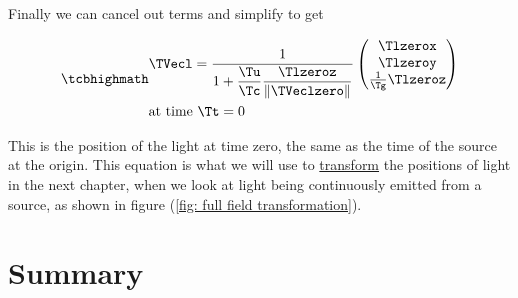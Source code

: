 

Finally we can cancel out terms and simplify to get

\begin{equation}
	\label{eq: time synced transform}
	\mhl{
		\begin{aligned}
			 & \TVecl  =
			\dfrac{1}{1 + \dfrac{\Tu }{\Tc } \dfrac{\Tlzeroz  }{\|\TVeclzero \|} }
			\begin{pmatrix}
				\Tlzerox                     \\
				\Tlzeroy                     \\
				\frac{1}{ \Tg  } \Tlzeroz  \\
			\end{pmatrix}
			\\
			 & \text{at time ${\Tt }=0$}
		\end{aligned}
	}
\end{equation}

This is the position of the light at time zero, the same as the time of the source at the origin.
This equation is what we will use to \hyperlink{def-transform}{transform} the positions of light in the next chapter, when we look at light being continuously emitted from a source, as shown in figure (\ref{fig: full field transformation}).

\section{Summary}\label{sect: Summary chapter 5}

